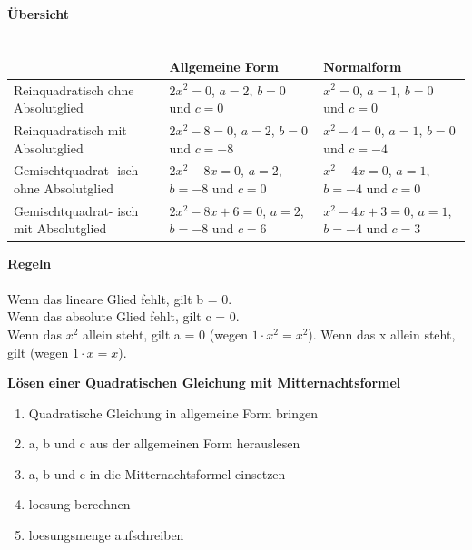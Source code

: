 \begin{multicols}{2}
    \textbf{Übersicht}\\~\\
    \begin{tabularx}{0.5\textwidth} {
            | >{\raggedright\arraybackslash}X
            | >{\raggedright\arraybackslash}X
            | >{\raggedright\arraybackslash}X |}
        \hline
        \textbf{}                               & \textbf{Allgemeine Form}                       & \textbf{Normalform}                           \\ \hline
        Reinquadratisch ohne Absolutglied       & $2x^2 = 0$, $a = 2$, $b = 0$ und $c = 0$       & $x^2 = 0$, $a = 1$, $b = 0$ und $c = 0$       \\\hline
        Reinquadratisch mit Absolutglied        & $2x^2 -8 = 0$, $a = 2$, $b = 0$ und $c = -8$   & $x^2-4 = 0$, $a = 1$, $b = 0$ und $c = -4$    \\ \hline
        Gemischtquadrat- isch ohne Absolutglied & $2x^2-8x = 0$, $a = 2$, $b = -8$ und $c = 0$   & $x^2 -4x= 0$,  $a = 1$, $b = -4$ und $c = 0$  \\ \hline
        Gemischtquadrat- isch mit Absolutglied  & $2x^2-8x+6 = 0$, $a = 2$, $b = -8$ und $c = 6$ & $x^2-4x+3 = 0$, $a = 1$, $b = -4$ und $c = 3$ \\ \hline
    \end{tabularx}

    \textbf{Regeln}\\~\\
    Wenn das lineare Glied fehlt, gilt b = 0. \\
    Wenn das absolute Glied fehlt, gilt c = 0. \\
    Wenn das $x^2$ allein steht, gilt a = 0 (wegen $1 \cdot x^2 = x^2$).
    Wenn das x allein steht, gilt (wegen $1 \cdot x = x$).

    \textbf{Lösen einer Quadratischen Gleichung mit Mitternachtsformel}

    \begin{enumerate}
        \item Quadratische Gleichung in allgemeine Form bringen
        \item a, b und c aus der allgemeinen Form herauslesen
        \item  a, b und c in die Mitternachtsformel einsetzen
        \item loesung berechnen
        \item loesungsmenge aufschreiben
    \end{enumerate}


\end{multicols}
